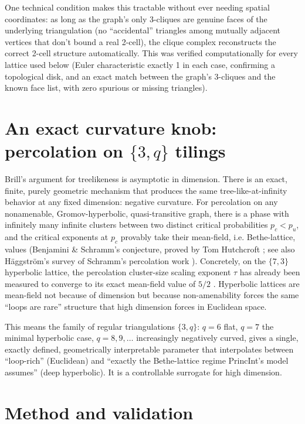 \documentclass[11pt]{article}
\begin{document}
One technical condition makes this tractable without ever needing spatial coordinates: as long as the graph's only 3-cliques are genuine faces of the underlying triangulation (no ``accidental'' triangles among mutually adjacent vertices that don't bound a real 2-cell), the clique complex reconstructs the correct 2-cell structure automatically. This was verified computationally for every lattice used below (Euler characteristic exactly 1 in each case, confirming a topological disk, and an exact match between the graph's 3-cliques and the known face list, with zero spurious or missing triangles).

\section{An exact curvature knob: percolation on $\{3,q\}$ tilings}

Brill's argument for treelikeness is asymptotic in dimension. There is an exact, finite, purely geometric mechanism that produces the same tree-like-at-infinity behavior at any fixed dimension: negative curvature. For percolation on any nonamenable, Gromov-hyperbolic, quasi-transitive graph, there is a phase with infinitely many infinite clusters between two distinct critical probabilities $p_c < p_u$, and the critical exponents at $p_c$ provably take their mean-field, i.e. Bethe-lattice, values (Benjamini \& Schramm's conjecture, proved by Tom Hutchcroft \citep{hutchcroft2019}; see also H\"aggstr\"om's survey of Schramm's percolation work \citep{haggstrom}). Concretely, on the $\{7,3\}$ hyperbolic lattice, the percolation cluster-size scaling exponent $\tau$ has already been measured to converge to its exact mean-field value of $5/2$ \citep{mertens2017}. Hyperbolic lattices are mean-field not because of dimension but because non-amenability forces the same ``loops are rare'' structure that high dimension forces in Euclidean space.

This means the family of regular triangulations $\{3,q\}$: $q = 6$ flat, $q = 7$ the minimal hyperbolic case, $q = 8, 9, \ldots$ increasingly negatively curved, gives a single, exactly defined, geometrically interpretable parameter that interpolates between ``loop-rich'' (Euclidean) and ``exactly the Bethe-lattice regime PrincInt's model assumes'' (deep hyperbolic). It is a controllable surrogate for high dimension.

\section{Method and validation}
\end{document}
